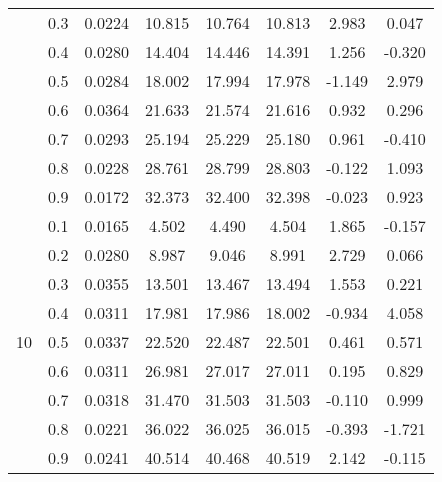 \documentclass[11pt,a4paper]{report}
\begin{document}
\begin{longtable}{ | c | c || c | c | c | c | c | c | }
 & 0.3 & 0.0224 & 10.815 & 10.764 & 10.813 & 2.983 & 0.047 \\
 & 0.4 & 0.0280 & 14.404 & 14.446 & 14.391 & 1.256 & -0.320 \\
 & 0.5 & 0.0284 & 18.002 & 17.994 & 17.978 & -1.149 & 2.979 \\
 & 0.6 & 0.0364 & 21.633 & 21.574 & 21.616 & 0.932 & 0.296 \\
 & 0.7 & 0.0293 & 25.194 & 25.229 & 25.180 & 0.961 & -0.410 \\
 & 0.8 & 0.0228 & 28.761 & 28.799 & 28.803 & -0.122 & 1.093 \\
 & 0.9 & 0.0172 & 32.373 & 32.400 & 32.398 & -0.023 & 0.923 \\
 \hline
\multirow{9}{*}{10} & 0.1 & 0.0165 & 4.502 & 4.490 & 4.504 & 1.865 & -0.157 \\
 & 0.2 & 0.0280 & 8.987 & 9.046 & 8.991 & 2.729 & 0.066 \\
 & 0.3 & 0.0355 & 13.501 & 13.467 & 13.494 & 1.553 & 0.221 \\
 & 0.4 & 0.0311 & 17.981 & 17.986 & 18.002 & -0.934 & 4.058 \\
 & 0.5 & 0.0337 & 22.520 & 22.487 & 22.501 & 0.461 & 0.571 \\
 & 0.6 & 0.0311 & 26.981 & 27.017 & 27.011 & 0.195 & 0.829 \\
 & 0.7 & 0.0318 & 31.470 & 31.503 & 31.503 & -0.110 & 0.999 \\
 & 0.8 & 0.0221 & 36.022 & 36.025 & 36.015 & -0.393 & -1.721 \\
 & 0.9 & 0.0241 & 40.514 & 40.468 & 40.519 & 2.142 & -0.115 \\
 \hline
\hline
\end{longtable}
\end{document}

